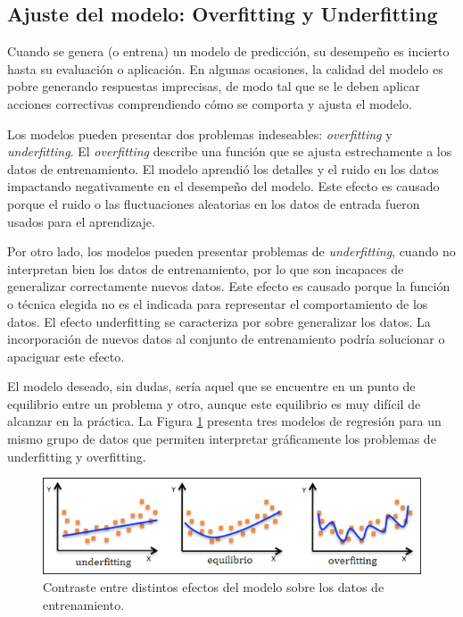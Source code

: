 \subsection{Ajuste del modelo: Overfitting y Underfitting\label{sub:Ajuste-del-modelo:}}

Cuando se genera (o entrena) un modelo de predicción, su desempeño
es incierto hasta su evaluación o aplicación. En algunas ocasiones,
la calidad del modelo es pobre generando respuestas imprecisas, de
modo tal que se le deben aplicar acciones correctivas comprendiendo
cómo se comporta y ajusta el modelo. 

Los modelos pueden presentar dos problemas indeseables: \emph{overfitting}
y \emph{underfitting}. El \emph{overfitting }describe una función
que se ajusta estrechamente a los datos de entrenamiento. El modelo
aprendió los detalles y el ruido en los datos impactando negativamente
en el desempeño del modelo. Este efecto es causado porque el ruido
o las fluctuaciones aleatorias en los datos de entrada fueron usados
para el aprendizaje. 

Por otro lado, los modelos pueden presentar problemas de \emph{underfitting},
cuando no interpretan bien los datos de entrenamiento, por lo que
son incapaces de generalizar correctamente nuevos datos. Este efecto
es causado porque la función o técnica elegida no es el indicada para
representar el comportamiento de los datos. El efecto underfitting
se caracteriza por sobre generalizar los datos. La incorporación de
nuevos datos al conjunto de entrenamiento podría solucionar o apaciguar
este efecto. 

El modelo deseado, sin dudas, sería aquel que se encuentre en un punto
de equilibrio entre un problema y otro, aunque este equilibrio es
muy difícil de alcanzar en la práctica. La Figura \ref{fig:under-overfitting}
presenta tres modelos de regresión para un mismo grupo de datos que
permiten interpretar gráficamente los problemas de underfitting y
overfitting.

\begin{figure}
\begin{centering}
\includegraphics[scale=0.85]{images/under-overfitting}
\par\end{centering}

\caption{Contraste entre distintos efectos del modelo sobre los datos de entrenamiento.\label{fig:under-overfitting}}
\end{figure}




  
